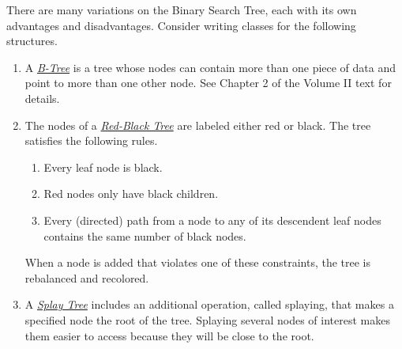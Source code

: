 There are many variations on the Binary Search Tree, each with its own advantages and disadvantages.
Consider writing classes for the following structures.
%
\begin{enumerate}
\item A \href{https://en.wikipedia.org/wiki/B-tree}{\emph{B-Tree}} is a tree whose nodes can contain more than one piece of data and point to more than one other node.
See Chapter 2 of the Volume II text for details.

\item The nodes of a \href{https://en.wikipedia.org/wiki/Red%E2%80%93black_tree}{\emph{Red-Black Tree}} are labeled either red or black.
The tree satisfies the following rules.
%
\begin{enumerate}
    \item Every leaf node is black.
    \item Red nodes only have black children.
    \item Every (directed) path from a node to any of its descendent leaf nodes contains the same number of black nodes.
\end{enumerate}
%
When a node is added that violates one of these constraints, the tree is rebalanced and recolored.

\item A \href{https://en.wikipedia.org/wiki/Splay_tree}{\emph{Splay Tree}} includes an additional operation, called splaying, that makes a specified node the root of the tree.
Splaying several nodes of interest makes them easier to access because they will be close to the root.
\end{enumerate}

